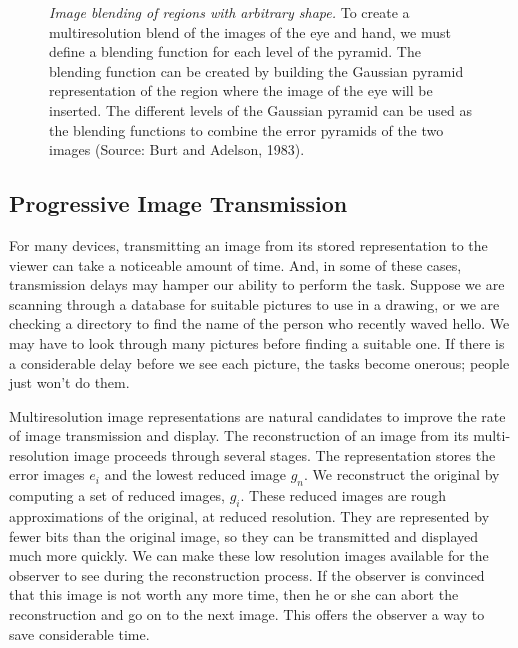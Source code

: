 \begin{figure}
\centerline{
}
\caption[Hand Eye Coordination]{
{\em Image blending of regions with arbitrary shape.}
To create a multiresolution
blend of the images of the eye and hand,
we must define a blending function for each level of the pyramid.
The blending function can be created by building the Gaussian pyramid
representation of the region where the image of the eye will be
inserted.  The different levels of the Gaussian pyramid can be used as
the blending functions to combine the error pyramids of the two images
(Source:  Burt and Adelson, 1983).
}
\label{f7:HandEye}
\end{figure}

\subsection*{Progressive Image Transmission}
For many devices, transmitting an image from its stored representation
to the viewer can take a noticeable amount of time.  And, in some of
these cases, transmission delays may hamper our ability to perform the
task.  Suppose we are scanning through a database for suitable
pictures to use in a drawing, or we are checking a directory to find
the name of the person who recently waved hello.  We may have to look
through many pictures before finding a suitable one.  If there is a
considerable delay before we see each picture, the tasks become
onerous; people just won't do them.

Multiresolution image representations are natural candidates to
improve the rate of image transmission and display.  The
reconstruction of an image from its multi-resolution image proceeds
through several stages.  The representation stores the error images
$e_i$ and the lowest reduced image $g_n$.  We reconstruct the original
by computing a set of reduced images, $g_i$.  These reduced images are
rough approximations of the original, at reduced resolution.  They are
represented by fewer bits than the original image, so they can be
transmitted and displayed much more quickly.  We can make these low
resolution images available for the observer to see during the
reconstruction process.  If the observer is convinced that this image
is not worth any more time, then he or she can abort the
reconstruction and go on to the next image.  This offers the observer
a way to save considerable time.

